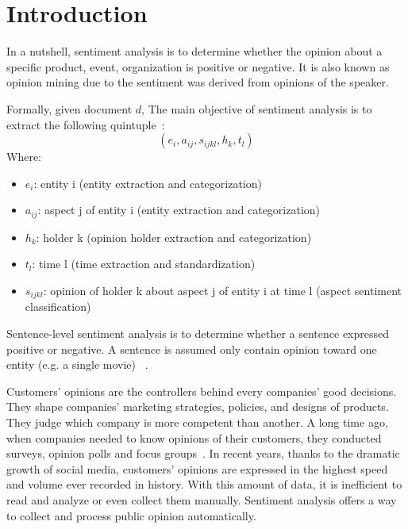 \section{Introduction}
In a nutshell, sentiment analysis is to determine whether the opinion about a specific product, event, organization is positive or negative. 
It is also known as opinion mining due to the sentiment was derived from opinions of the speaker.

Formally, given document $d$, The main objective of sentiment analysis is to extract the following quintuple~\cite{liu2012sentiment}:
\[ ( e_{i}, a_{ij}, s_{ijkl}, h_{k}, t_{l} ) \]
Where:
\begin{itemize}
	\item $e_{i}$: entity i (entity extraction and categorization)
	\item $a_{ij}$: aspect j of entity i (entity extraction and categorization)
	\item $h_{k}$: holder k (opinion holder extraction and categorization)
	\item $t_{l}$: time l (time extraction and standardization)
	\item $s_{ijkl}$: opinion of holder k about aspect j of entity i at time l (aspect sentiment classification)
\end{itemize}
Sentence-level sentiment analysis is to determine whether a sentence expressed positive or negative. 
A sentence is assumed only contain opinion toward one entity (e.g. a single movie) ~\cite{liu2012sentiment}.

Customers' opinions are the controllers behind every companies' good decisions.
They shape companies' marketing strategies, policies, and designs of products.
They judge which company is more competent than another.
A long time ago, when companies needed to know opinions of their customers, they conducted surveys, opinion polls and focus groups~\cite{liu2012sentiment}.
In recent years, thanks to the dramatic growth of social media, customers' opinions are expressed in the highest speed and volume ever recorded in history.
With this amount of data, it is inefficient to read and analyze or even collect them manually. 
Sentiment analysis offers a way to collect and process public opinion automatically.

